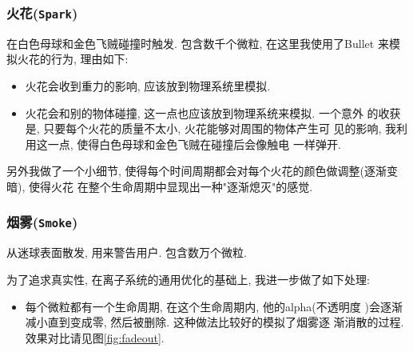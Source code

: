 \documentclass[11pt]{article}
\begin{document}
\subsubsection{火花(\texttt{Spark})}
\label{sec-3-2-1}
在白色母球和金色飞贼碰撞时触发. 包含数千个微粒, 在这里我使用了Bullet
来模拟火花的行为, 理由如下:
\begin{itemize}
\item 火花会收到重力的影响, 应该放到物理系统里模拟.
\item 火花会和别的物体碰撞, 这一点也应该放到物理系统来模拟. 一个意外
的收获是, 只要每个火花的质量不太小, 火花能够对周围的物体产生可
见的影响, 我利用这一点, 使得白色母球和金色飞贼在碰撞后会像触电
一样弹开.
\end{itemize}

另外我做了一个小细节, 使得每个时间周期都会对每个火花的颜色做调整(逐渐变暗), 使得火花
在整个生命周期中显现出一种"逐渐熄灭"的感觉. 
\subsubsection{烟雾(\texttt{Smoke})}
\label{sec-3-2-2}
从迷球表面散发, 用来警告用户. 包含数万个微粒.

为了追求真实性, 在离子系统的通用优化的基础上, 我进一步做了如下处理:
\begin{itemize}
\item 每个微粒都有一个生命周期, 在这个生命周期内, 他的alpha(不透明度
)会逐渐减小直到变成零, 然后被删除.  这种做法比较好的模拟了烟雾逐
渐消散的过程. 效果对比请见图\ref{fig:fadeout}.
\end{itemize}
\end{document}
